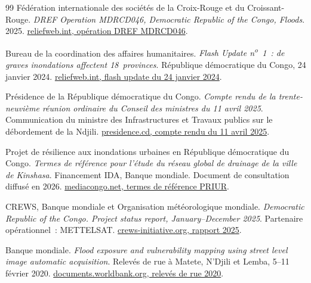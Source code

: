 \documentclass[12pt,a4paper]{article}
\begin{document}
\clearpage
{}
{}
\begin{thebibliography}{99}
Fédération internationale des sociétés de la Croix-Rouge et du Croissant-Rouge.
\emph{DREF Operation MDRCD046, Democratic Republic of the Congo, Floods}.
2025.
\href{https://reliefweb.int/attachments/d10b84da-d4c9-45a3-aaa3-0594b96b4c72/MDRCD046do.pdf}{reliefweb.int, opération DREF MDRCD046}.

Bureau de la coordination des affaires humanitaires.
\emph{Flash Update n\textsuperscript{o}~1~: de graves inondations affectent 18~provinces}.
République démocratique du Congo, 24 janvier 2024.
\href{https://reliefweb.int/attachments/54eda70e-28fb-4f52-915e-dbef7e99789c/OCHA\%20DRC\%20Flash\%20Update1\%20Inondations\%202023-2024.pdf}{reliefweb.int, flash update du 24 janvier 2024}.

Présidence de la République démocratique du Congo.
\emph{Compte rendu de la trente-neuvième réunion ordinaire du Conseil des ministres du 11 avril 2025}.
Communication du ministre des Infrastructures et Travaux publics sur le débordement de la Ndjili.
\href{https://presidence.cd/uploads/files/COMPTE\%20RENDU\%20DE\%20LA\%20TRENTE-NEUVIEME\%20REUNION\%20ORDINAIRE\%20DU\%20CONSEIL\%20DES\%20MINISTRES\%20DU\%2011\%20AVRIL\%202025.pdf}{presidence.cd, compte rendu du 11 avril 2025}.

Projet de résilience aux inondations urbaines en République démocratique du Congo.
\emph{Termes de référence pour l'étude du réseau global de drainage de la ville de Kinshasa}.
Financement IDA, Banque mondiale. Document de consultation diffusé en 2026.
\href{https://www.mediacongo.net/dpics/filesmanager/jobaof/2026/02-fevrier/01/ci_260205_02_04.pdf}{mediacongo.net, termes de référence PRIUR}.

CREWS, Banque mondiale et Organisation météorologique mondiale.
\emph{Democratic Republic of the Congo. Project status report, January--December 2025}.
Partenaire opérationnel~: METTELSAT.
\href{https://crews-initiative.org/wp-content/uploads/2026/09/CREWS-Democratic-Republic-of-Congo-Project-Status-Report-Jan\%E2\%80\%93Dec-2025.pdf}{crews-initiative.org, rapport 2025}.

Banque mondiale.
\emph{Flood exposure and vulnerability mapping using street level image automatic acquisition}.
Relevés de rue à Matete, N'Djili et Lemba, 5--11 février 2020.
\href{https://documents1.worldbank.org/curated/en/099648304032428971/pdf/IDU1e7b0c081137c5142051b4f017e8c4d6964b9.pdf}{documents.worldbank.org, relevés de rue 2020}.


\end{thebibliography}
\end{document}
